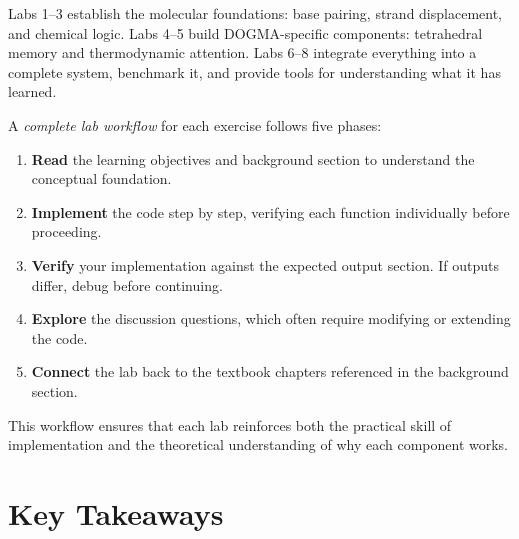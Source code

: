 Labs 1--3 establish the molecular foundations: base pairing, strand displacement, and chemical logic. Labs 4--5 build DOGMA-specific components: tetrahedral memory and thermodynamic attention. Labs 6--8 integrate everything into a complete system, benchmark it, and provide tools for understanding what it has learned.

\begin{dogmadef}
A \emph{complete lab workflow} for each exercise follows five phases:
\begin{enumerate}[leftmargin=1.5em]
  \item \textbf{Read} the learning objectives and background section to understand the conceptual foundation.
  \item \textbf{Implement} the code step by step, verifying each function individually before proceeding.
  \item \textbf{Verify} your implementation against the expected output section. If outputs differ, debug before continuing.
  \item \textbf{Explore} the discussion questions, which often require modifying or extending the code.
  \item \textbf{Connect} the lab back to the textbook chapters referenced in the background section.
\end{enumerate}
This workflow ensures that each lab reinforces both the practical skill of implementation and the theoretical understanding of why each component works.
\end{dogmadef}


\section{Key Takeaways}

